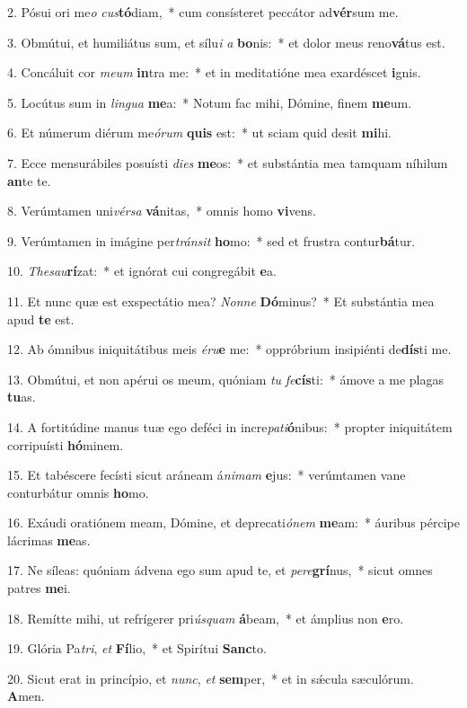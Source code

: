 2. Pósui ori me\textit{o} \textit{cus}\textbf{tó}diam,~*  cum consísteret peccátor ad\textbf{vér}sum me.\

3. Obmútui, et humiliátus sum, et sílu\textit{i} \textit{a} \textbf{bo}nis:~*  et dolor meus reno\textbf{vá}tus est.\

4. Concáluit cor \textit{me}\textit{um} \textbf{in}tra me:~*  et in meditatióne mea exardéscet \textbf{i}gnis.\

5. Locútus sum in \textit{lin}\textit{gua} \textbf{me}a:~*  Notum fac mihi, Dómine, finem \textbf{me}um.\

6. Et númerum diérum me\textit{ó}\textit{rum} \textbf{quis} est:~*  ut sciam quid desit \textbf{mi}hi.\

7. Ecce mensurábiles posuísti \textit{di}\textit{es} \textbf{me}os:~*  et substántia mea tamquam níhilum \textbf{an}te te.\

8. Verúmtamen uni\textit{vér}\textit{sa} \textbf{vá}nitas,~*  omnis homo \textbf{vi}vens.\

9. Verúmtamen in imágine per\textit{tráns}\textit{it} \textbf{ho}mo:~*  sed et frustra contur\textbf{bá}tur.\

10. \textit{The}\textit{sau}\textbf{rí}zat:~*  et ignórat cui congregábit \textbf{e}a.\

11. Et nunc quæ est exspectátio mea? \textit{Non}\textit{ne} \textbf{Dó}minus?~*  Et substántia mea apud \textbf{te} est.\

12. Ab ómnibus iniquitátibus meis \textit{é}\textit{ru}\textbf{e} me:~*  oppróbrium insipiénti de\textbf{dís}ti me.\

13. Obmútui, et non apérui os meum, quóniam \textit{tu} \textit{fe}\textbf{cís}ti:~*  ámove a me plagas \textbf{tu}as.\

14. A fortitúdine manus tuæ ego deféci in incre\textit{pa}\textit{ti}\textbf{ó}nibus:~*  propter iniquitátem corripuísti \textbf{hó}minem.\

15. Et tabéscere fecísti sicut aráneam á\textit{ni}\textit{mam} \textbf{e}jus:~*  verúmtamen vane conturbátur omnis \textbf{ho}mo.\

16. Exáudi oratiónem meam, Dómine, et deprecati\textit{ó}\textit{nem} \textbf{me}am:~*  áuribus pércipe lácrimas \textbf{me}as.\

17. Ne síleas: quóniam ádvena ego sum apud te, et \textit{per}\textit{e}\textbf{grí}nus,~*  sicut omnes patres \textbf{me}i.\

18. Remítte mihi, ut refrígerer pri\textit{ús}\textit{quam} \textbf{á}beam,~*  et ámplius non \textbf{e}ro.\

19. Glória Pa\textit{tri}, \textit{et} \textbf{Fí}lio,~*  et Spirítui \textbf{Sanc}to.\

20. Sicut erat in princípio, et \textit{nunc}, \textit{et} \textbf{sem}per,~*  et in sǽcula sæculórum. \textbf{A}men.\

